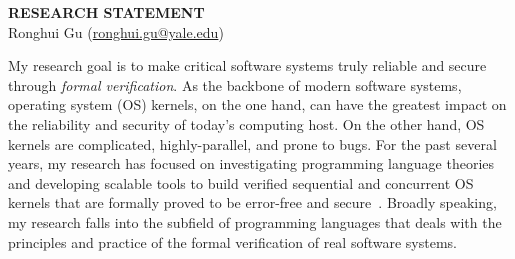 \documentclass[a4paper, 10pt]{article}
\newcommand*{\email}[1]{\normalsize\href{mailto:#1}{#1}}
\begin{document}
\thispagestyle{fancy}
\lhead{}
\rhead{}
\renewcommand{\headrulewidth}{0pt} 
\renewcommand{\footrulewidth}{0pt} 


\pagestyle{fancy}
\lhead{\textcolor{gray}{\it Ronghui Gu}}
\rhead{\textcolor{gray}{\thepage/\totalpages{}}}

\begin{small}

\begin{center}
{\LARGE \bf RESEARCH STATEMENT}\\
\vspace*{0.2cm}
{\normalsize Ronghui Gu (\email{ronghui.gu@yale.edu})}
\end{center}



My research goal is to make critical software systems truly reliable and secure through \emph{formal verification}.
As the backbone of 
modern software systems,
operating system (OS) kernels,
on the one hand,
 can have the greatest impact on the reliability and security of today's computing host.
On the other hand, OS kernels are complicated, highly-parallel, and prone to bugs.  For the past several years,  my research has focused on investigating programming language theories and developing scalable tools to build verified sequential and concurrent OS kernels that are formally proved to be error-free and secure~\cite{popl15-gu, osdi16-gu, pldi16-security, pldi16-device}.
Broadly speaking, my research
falls into 
the subfield of programming languages that
deals with the principles and practice of  the formal verification
of real software systems.



\end{small}
\end{document}
